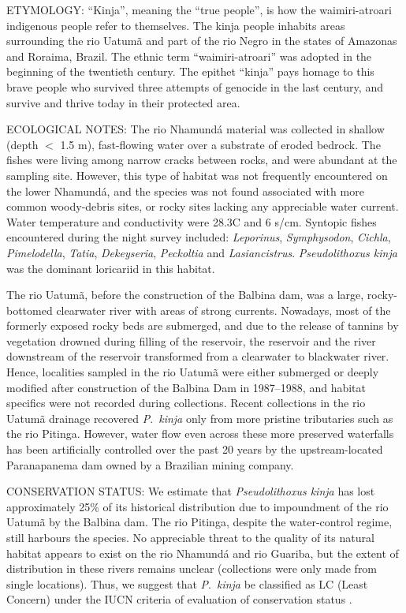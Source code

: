 \documentclass[12pt]{article}
\begin{document}
\noindent ETYMOLOGY: ``Kinja'', meaning the ``true people'', is how the waimiri-atroari indigenous people refer to themselves. %
The kinja people inhabits areas surrounding the rio Uatumã and part of the rio Negro in the states of Amazonas and Roraima, Brazil. %
The ethnic term ``waimiri-atroari'' was adopted in the beginning of the twentieth century. %
The epithet ``kinja'' pays homage to this brave people who survived three attempts of genocide in the last century, and survive and thrive today in their protected area.\\%
\bigskip

\noindent ECOLOGICAL NOTES: The rio Nhamundá material was collected in shallow (depth $<$ 1.5 m), fast-flowing water over a substrate of eroded bedrock. %
The fishes were living among narrow cracks between rocks, and were abundant at the sampling site. %
However, this type of habitat was not frequently encountered on the lower Nhamundá, and the species was not found associated with more common woody-debris sites, or rocky sites lacking any appreciable water current. %
Water temperature and conductivity were 28.3\degree C and 6 \micro s/cm. %
Syntopic fishes encountered during the night survey included: \emph{Leporinus}, \emph{Symphysodon}, \emph{Cichla}, \emph{Pimelodella}, \emph{Tatia}, \emph{Dekeyseria}, \emph{Peckoltia} and \emph{Lasiancistrus}. %
\emph{Pseudolithoxus kinja} was the dominant loricariid in this habitat.%

The rio Uatumã, before the construction of the Balbina dam, was a large, rocky-bottomed clearwater river with areas of strong currents. %
Nowadays, most of the formerly exposed rocky beds are submerged, and due to the release of tannins by vegetation drowned during filling of the reservoir, the reservoir and the river downstream of the reservoir transformed from a clearwater to blackwater river. %
Hence, localities sampled in the rio Uatumã were either submerged or deeply modified after construction of the Balbina Dam in 1987--1988, and habitat specifics were not recorded during collections. %
Recent collections in the rio Uatumã drainage recovered \emph{P}.\ \emph{kinja} only from more pristine tributaries such as the rio Pitinga. %
However, water flow even across these more preserved waterfalls has been artificially controlled over the past 20 years by the upstream-located Paranapanema dam owned by a Brazilian mining company.\\%
\bigskip

\noindent CONSERVATION STATUS: We estimate that \emph{Pseudolithoxus kinja} has lost approximately 25\% of its historical distribution due to impoundment of the rio Uatumã by the Balbina dam. %
The rio Pitinga, despite the water-control regime, still harbours the species. %
No appreciable threat to the quality of its natural habitat appears to exist on the rio Nhamundá and rio Guariba, but the extent of distribution in these rivers remains unclear (collections were only made from single locations). %
Thus, we suggest that \emph{P}.\ \emph{kinja} be classified as LC (Least Concern) under the IUCN criteria of evaluation of conservation status \citep{IUCN2012}.%
\end{document}
